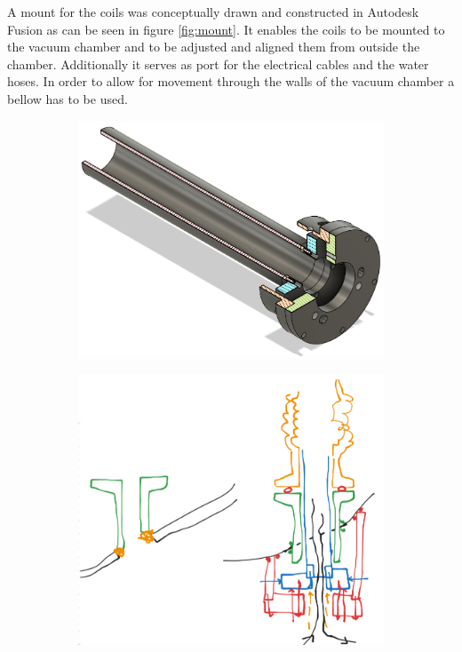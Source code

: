 A mount for the coils was conceptually drawn and constructed in Autodesk Fusion as can be seen in figure \ref{fig:mount}.
It enables the coils to be mounted to the vacuum chamber and to be adjusted and aligned them from outside the chamber.
Additionally it serves as port for the electrical cables and the water hoses.
In order to allow for movement through the walls of the vacuum chamber a bellow has to be used.
\begin{figure}[H]
    \begin{subfigure}[b]{0.5\textwidth}
        \centering
        \includegraphics[width=\textwidth]{Images/02_Coils/Coil_mount_crosssection.png}
        \label{fig:Coil mount crosssection}
    \end{subfigure}
    \hfill
    \begin{subfigure}[b]{0.5\textwidth}
        \centering
        \includegraphics[width=\textwidth]{Images/02_Coils/coil_mount.png}

\end{subfigure}
\end{figure}
